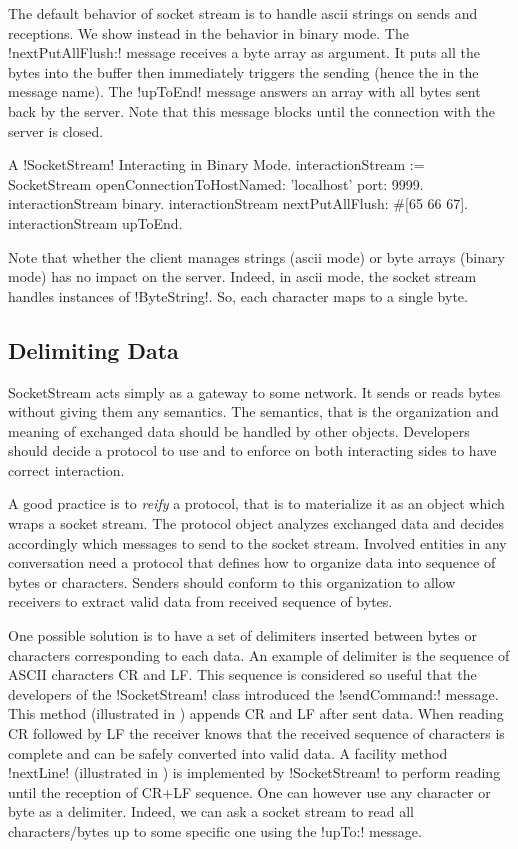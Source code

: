 \documentclass[a4paper,10pt,twoside]{book}
\begin{document}
The default behavior of socket stream is to handle ascii strings on sends and receptions.
We show instead in  the behavior in binary mode.
The \ct!nextPutAllFlush:! message receives a byte array as argument.
It puts all the bytes into the buffer then immediately triggers the sending (hence the  in the message name).
The \ct!upToEnd! message answers an array with all bytes sent back by the server.
Note that this message blocks until the connection with the server is closed.


\begin{script}{A \ct!SocketStream! Interacting in Binary Mode.}
interactionStream := SocketStream 
									openConnectionToHostNamed: 'localhost' 
									port: 9999.  
interactionStream binary.
interactionStream nextPutAllFlush: #[65 66 67].
interactionStream upToEnd.
\end{script}

Note that whether the client manages strings (ascii mode) or byte arrays (binary mode) has no impact on the server.
Indeed, in ascii mode, the socket stream handles instances of \ct!ByteString!.
So, each character maps to a single byte. 

\subsection{Delimiting Data}
SocketStream acts simply as a gateway to some network. 
It sends or reads bytes without giving them any semantics.
The semantics, that is the organization and meaning of exchanged data should be handled by other objects.
Developers should decide a protocol to use and to enforce on both interacting sides to have correct interaction.

A good practice is to \emph{reify} a protocol, that is to materialize it as an object which wraps a socket stream. 
The protocol object analyzes exchanged data and decides accordingly which messages to send to the socket stream.
Involved entities in any conversation need a protocol that defines how to organize data into sequence of bytes or characters.
Senders should conform to this organization to allow receivers to extract valid data from received sequence of bytes.
 
One possible solution is to have a set of delimiters inserted between bytes or characters corresponding to each data.
An example of delimiter is the sequence of ASCII characters CR and LF.
This sequence is considered so useful that the developers of the \ct!SocketStream! class introduced the \ct!sendCommand:! message.
This method (illustrated in ) appends CR and LF after sent data.
When reading CR followed by LF the receiver knows that the received sequence of characters is complete and can be safely converted into valid data.
A facility method \ct!nextLine! (illustrated in ) is implemented by \ct!SocketStream! to perform reading until the reception of CR+LF sequence.
One can however use any character or byte as a delimiter.
Indeed, we can ask a socket stream to read all characters/bytes up to some specific one using the \ct!upTo:! message.
\end{document}
